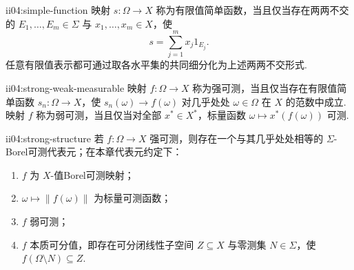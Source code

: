 \begin{FADefinition}[A][Banach值简单函数]{ii04:simple-function}
映射 \(\displaystyle s:\Omega\to X\) 称为有限值简单函数，当且仅当存在两两不交的 \(\displaystyle E_1,\dots,E_m\in\Sigma\) 与 \(\displaystyle x_1,\dots,x_m\in X\)，使
\[
s=\sum_{j=1}^{m}x_j1_{E_j}.
\]
任意有限值表示都可通过取各水平集的共同细分化为上述两两不交形式.
\end{FADefinition}

\begin{FADefinition}[A][强可测与弱可测]{ii04:strong-weak-measurable}
映射 \(\displaystyle f:\Omega\to X\) 称为强可测，当且仅当存在有限值简单函数 \(\displaystyle s_n:\Omega\to X\)，使 \(\displaystyle s_n(\omega)\to f(\omega)\) 对几乎处处 \(\displaystyle\omega\in\Omega\) 在 \(\displaystyle X\) 的范数中成立. 映射 \(\displaystyle f\) 称为弱可测，当且仅当对全部 \(\displaystyle x^*\in X^*\)，标量函数 \(\displaystyle\omega\mapsto x^*(f(\omega))\) 可测.
\end{FADefinition}

\begin{FAProposition}[C][强可测的基本结构]{ii04:strong-structure}
若 \(\displaystyle f:\Omega\to X\) 强可测，则存在一个与其几乎处处相等的 \(\displaystyle\Sigma\)-Borel可测代表元；在本章代表元约定下：
\begin{enumerate}[label=\textnormal{(\roman*)}]
\item \(\displaystyle f\) 为 \(\displaystyle X\)-值Borel可测映射；
\item \(\displaystyle\omega\mapsto\|f(\omega)\|\) 为标量可测函数；
\item \(\displaystyle f\) 弱可测；
\item \(\displaystyle f\) 本质可分值，即存在可分闭线性子空间 \(\displaystyle Z\subseteq X\) 与零测集 \(\displaystyle N\in\Sigma\)，使 \(\displaystyle f(\Omega\setminus N)\subseteq Z\).
\end{enumerate}
\end{FAProposition}

